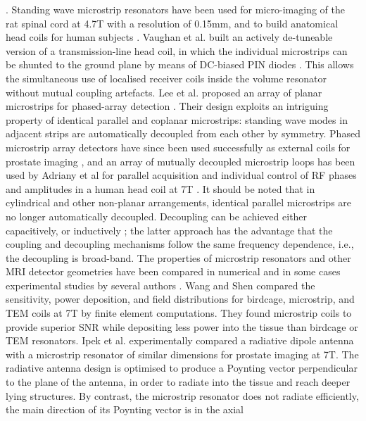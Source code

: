 \cite{Zhang:2003ju}. Standing wave microstrip resonators have been used for
micro-imaging of the rat spinal cord at 4.7T with a resolution of
0.15mm, and to build anatomical head coils for human subjects
\cite{Driesel:2008di}. Vaughan et al. built an actively de-tuneable version
of a transmission-line head coil, in which the individual microstrips
can be shunted to the ground plane by means of DC-biased PIN diodes
\cite{Vaughan:2002cs}. This allows the simultaneous use of localised
receiver coils inside the volume resonator without mutual coupling
artefacts. Lee et al. proposed an array of planar microstrips
\cite{Lee:2001ji,Boskamp:2006tl} for phased-array detection
\cite{Roemer:1990gs,Hoult:2004gm}. Their design exploits an intriguing
property of identical parallel and coplanar microstrips: standing wave
modes in adjacent strips are automatically decoupled from each other by
symmetry. Phased microstrip array detectors have since been used
successfully as external coils for prostate imaging
\cite{vandenBergen:2010hg}, and an array of mutually decoupled microstrip
loops has been used by Adriany et al for parallel acquisition and
individual control of RF phases and amplitudes in a human head coil at
7T \cite{Adriany:2005cw}. It should be noted that in cylindrical and other
non-planar arrangements, identical parallel microstrips are no longer
automatically decoupled. Decoupling can be achieved either capacitively,
or inductively \cite{Wu:2006bs}; the latter approach has the advantage that
the coupling and decoupling mechanisms follow the same frequency
dependence, i.e., the decoupling is broad-band. The properties of
microstrip resonators and other MRI detector geometries have been
compared in numerical and in some cases experimental studies by several
authors \cite{Wang:2006gk,vandenBergen:2009dk,Ipek:2012bm}. Wang and Shen
\cite{Wang:2006gk} compared the sensitivity, power deposition, and field
distributions for birdcage, microstrip, and TEM coils at 7T by finite
element computations. They found microstrip coils to provide superior
SNR while depositing less power into the tissue than birdcage or TEM
resonators. Ipek et al. \cite{Ipek:2012bm} experimentally compared a
radiative dipole antenna with a microstrip resonator of similar
dimensions for prostate imaging at 7T. The radiative antenna design is
optimised to produce a Poynting vector perpendicular to the plane of the
antenna, in order to radiate into the tissue and reach deeper lying
structures. By contrast, the microstrip resonator does not radiate
efficiently, the main direction of its Poynting vector is in the axial
